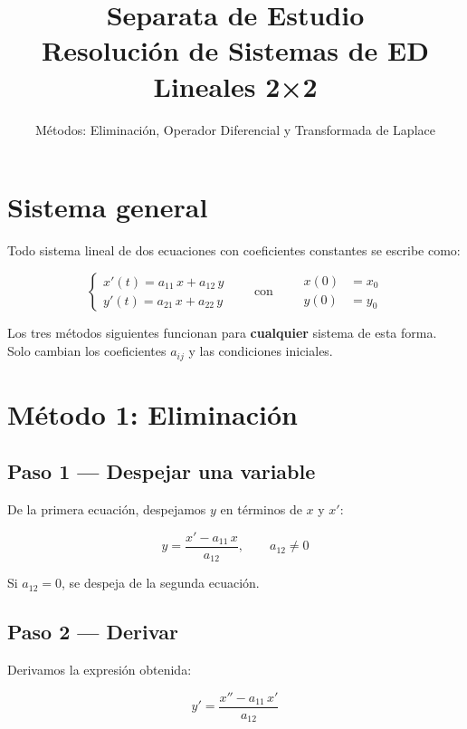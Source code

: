 \documentclass[9pt,a4paper]{article}
\title{\textbf{Separata de Estudio}\\[2pt]
\large Resolución de Sistemas de ED Lineales 2×2}
\author{Métodos: Eliminación, Operador Diferencial y Transformada de Laplace}
\date{}
\begin{document}
\maketitle

\section*{Sistema general}

Todo sistema lineal de dos ecuaciones con coeficientes constantes se escribe como:

\[
\boxed{
\begin{cases}
x'(t) = a_{11}\,x + a_{12}\,y \\[2pt]
y'(t) = a_{21}\,x + a_{22}\,y
\end{cases}
\qquad\text{con}\qquad
\begin{aligned}
x(0) &= x_0 \\
y(0) &= y_0
\end{aligned}
}
\]

\smallskip
Los tres métodos siguientes funcionan para \textbf{cualquier} sistema de esta forma. Solo cambian los coeficientes \(a_{ij}\) y las condiciones iniciales.


\section{Método 1: Eliminación}

\subsection{Paso 1 --- Despejar una variable}

De la primera ecuación, despejamos \(y\) en términos de \(x\) y \(x'\):

\[
y = \frac{x' - a_{11}\,x}{a_{12}}, \qquad a_{12} \neq 0
\]

Si \(a_{12} = 0\), se despeja de la segunda ecuación.

\subsection{Paso 2 --- Derivar}

Derivamos la expresión obtenida:

\[
y' = \frac{x'' - a_{11}\,x'}{a_{12}}
\]
\end{document}
